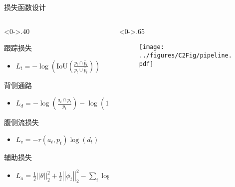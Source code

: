 \begin{frame}{损失函数设计}
	\begin{columns}[T] %
		\begin{column}<0->{.40\textwidth}
			\begin{block}{}
				跟踪损失
				\begin{itemize}
					\item<0-> $ L_t = -\log(\mbox{IoU} ( \frac{p_t \cap \hat{p}_t}{p_t \cup \hat{p}_t} )) $
				\end{itemize}
				
				背侧通路
				\begin{itemize}
					\item<0-> $ L_d = -\log (\frac{a_t \cap p_t}{p_t}) - \log (1 - \frac{a_t \cap F_t}{a_t \cup F_t}) $
				\end{itemize}
				
				腹侧流损失
				\begin{itemize}
					\item<0-> $ L_v = - r(a_t, p_t) \log(d_t) $
				\end{itemize}
				
				辅助损失
				\begin{itemize}
					\item<0-> $ L_a = 
					\frac{1}{2} \left\vert \left\vert \theta \right\vert \right\vert _2 ^2 + 
					\frac{1}{2} \left\vert \left\vert \phi_t \right\vert \right\vert _2 ^2
					- \sum_{i} \log (\lambda_i^{-1}) $
				\end{itemize}
			\end{block}
		\end{column}
		\hfill%
		
		\begin{column}<0->{.65\textwidth}
			\begin{figure}[!t]
				\centering
				\texttt{[image: ../figures/C2Fig/pipeline.pdf]}
			\end{figure}
		\end{column}%
	\end{columns}
	
\end{frame}


